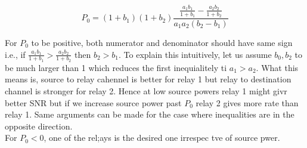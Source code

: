 \documentclass[titlepage]{article}
\begin{document}
\begin{equation}
	P_0 = (1+b_1)(1+b_2) \frac{\frac{a_1b_1}{1+b_1} - 
	\frac{a_2b_2}{1+b_2}}{a_1a_2(b_2-b_1)}
\end{equation}

For $P_0$ to be positive, both numerator and denominator should 
have same sign i.e., if 
$\frac{a_1b_1}{1+b_1} >	\frac{a_2b_2}{1+b_2}$ then $b_2 > b_1$.
	To explain this intuitively, let us assume $b_0,b_2$ to be 
	much larger than 1 which reduces the first inequialitely ti
	$a_1 > a_2$. What this means is, source to relay cahennel is 
	better for relay 1 but relay to destination channel is stronger
	for relay 2. Hence at low source powers relay 1 might givr
	better SNR but if we increase source power past $P_0$ relay 2 
	gives more rate than relay 1. Same arguments can be made 
	for the case where inequalities are in the opposite
	direction. 
	\\
	For $P_0 < 0$, one of the rel;ays is the desired one irrespec
	tve of source pwer.
\end{document}
